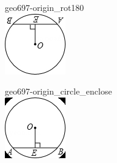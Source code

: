 \documentclass[12pt]{article}
\begin{document}
\begin{center}
\begin{minipage}{0.32\textwidth}
\end{minipage}
\par\medskip
\begin{minipage}{0.32\textwidth}\centering
geo697-origin\_rot180\\
\includegraphics[width=0.95\linewidth]{out_rommath_origin/items/geo697-origin/assets/figure_rot180.png}
\end{minipage}
\hfill\begin{minipage}{0.32\textwidth}\centering
geo697-origin\_circle\_enclose\\
\includegraphics[width=0.95\linewidth]{out_rommath_origin/items/geo697-origin/assets/figure_circle.png}
\end{minipage}
\par
\end{center}
\bigskip
\end{document}
